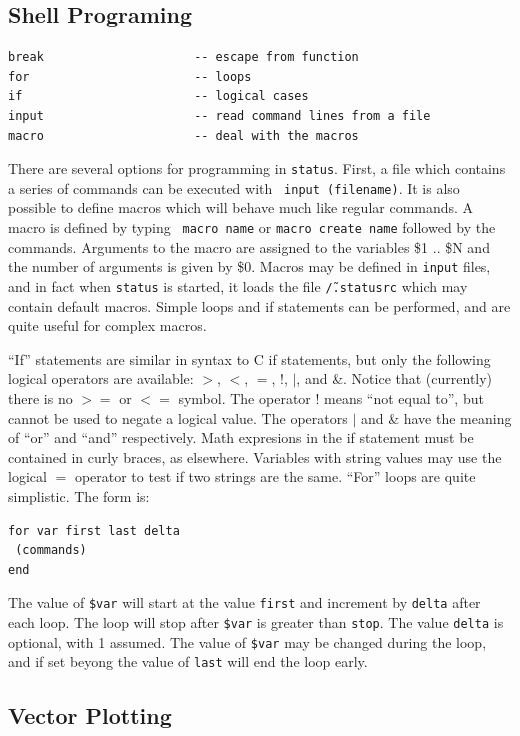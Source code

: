 \documentclass{article}
\begin{document}
\subsection{Shell Programing}
\begin{verbatim}
break                     -- escape from function 
for                       -- loops 
if                        -- logical cases 
input                     -- read command lines from a file 
macro                     -- deal with the macros 
\end{verbatim}

There are several options for programming in {\tt status}.  First, a
file which contains a series of commands can be executed with {\tt
  input (filename)}.  It is also possible to define macros which will
behave much like regular commands.  A macro is defined by typing {\tt
  macro name} or {\tt macro create name} followed by the commands.
Arguments to the macro are assigned to the variables \$1 .. \$N and
the number of arguments is given by \$0.  Macros may be defined in
{\tt input} files, and in fact when {\tt status} is started, it loads
the file {\tt \~/.statusrc} which may contain default macros.  Simple
loops and if statements can be performed, and are quite useful for
complex macros.  

``If'' statements are similar in syntax to C if statements, but only
the following logical operators are available: $>$, $<$, $=$, !, $|$,
and \&.  Notice that (currently) there is no $>=$ or $<=$ symbol.  The
operator ! means ``not equal to'', but cannot be used to negate a
logical value.  The operators $|$ and \& have the meaning of ``or'' and
``and'' respectively.  Math expresions in the if statement must be
contained in curly braces, as elsewhere.  Variables with string values
may use the logical $=$ operator to test if two strings are the same.
``For'' loops are quite simplistic.  The form is:
\begin{verbatim}
for var first last delta
 (commands)
end
\end{verbatim}
The value of {\tt \$var} will start at the value {\tt first} and increment by
{\tt delta} after each loop.  The loop will stop after {\tt \$var} is greater
than {\tt stop}.  The value {\tt delta} is optional, with 1 assumed.
The value of {\tt \$var} may be changed during the loop, and if set
beyong the value of {\tt last} will end the loop early.  

\subsection{Vector Plotting}
\end{document}
